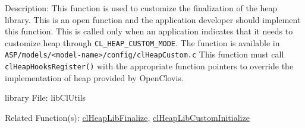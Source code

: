 \begin{flushleft}
\begin{Desc}
\end{Desc}
\begin{Desc}
\item[Description:]
This function is used to customize the finalization of the heap library.
This is an open function and the application developer should implement this function. This is called only
when an application indicates that it needs to customize heap through
{\tt{CL\_\-HEAP\_\-CUSTOM\_\-MODE}}. The function is
available in {\tt{ASP/models/<model-name>/config/clHeapCustom.c}}
This function must call {\tt{clHeapHooksRegister()}} with the appropriate
function pointers to override the implementation of heap provided by
OpenClovis.
\end{Desc}
\begin{Desc}
\item[library File:]lib\-Cl\-Utils\end{Desc}
\begin{Desc}
\item[Related Function(s):]\hyperlink{pageheap102}{clHeapLibFinalize}, \hyperlink{pageheap130}{clHeapLibCustomInitialize}
\end{Desc}
\newpage




\end{flushleft}
